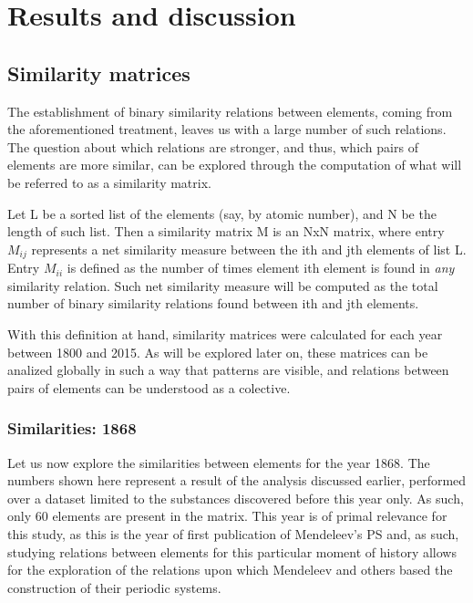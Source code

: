 \documentclass[article]{article}
\begin{document}
\section{Results and discussion}

\subsection{Similarity matrices}

The establishment of binary similarity relations between elements, coming from the aforementioned treatment, leaves us with a large number of such relations. The question about which relations are stronger, and thus, which pairs of elements are more similar, can be explored through the computation of what will be referred to as a similarity matrix.

\begin{definition}
\label{def:def2}
Let L be a sorted list of the elements (say, by atomic number), and N be the length of such list.
Then a similarity matrix M is an NxN matrix, where entry $M_{ij}$ represents a net similarity measure between the ith and jth elements of list L. Entry $M_{ii}$ is defined as the number of times element ith element is found in \textit{any} similarity relation. Such net similarity measure will be computed as the total number of binary similarity relations found between ith and jth elements.
\end{definition}

With this definition at hand, similarity matrices were calculated for each year between 1800 and 2015. As will be explored later on, these matrices can be analized globally in such a way that patterns are visible, and relations between pairs of elements can be understood as a colective.\\

\subsubsection{Similarities: 1868}
Let us now explore the similarities between elements for the year 1868. The numbers shown here represent a result of the analysis discussed earlier, performed over a dataset limited to the substances discovered before this year only. As such, only 60 elements are present in the matrix. This year is of primal relevance for this study, as this is the year of first publication of Mendeleev's PS and, as such, studying relations between elements for this particular moment of history allows for the exploration of the relations upon which Mendeleev and others based the construction of their periodic systems.\\
\end{document}
